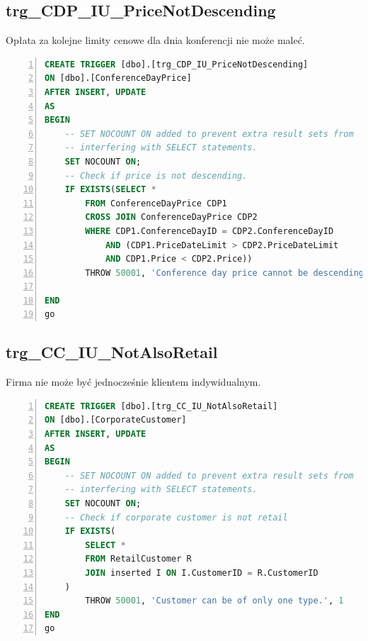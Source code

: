 \documentclass[]{article}
\begin{document}
	\subsection{trg\_CDP\_IU\_PriceNotDescending}
Opłata za kolejne limity cenowe dla dnia konferencji nie może maleć.
\begin{lstlisting}[language=SQL,
showspaces=false,
basicstyle=\ttfamily,
numbers=left,
numberstyle=\tiny,
tabsize=2,
backgroundcolor=\color{lightg},
keywordstyle=\color{lightblue},
commentstyle=\color{gray}]
CREATE TRIGGER [dbo].[trg_CDP_IU_PriceNotDescending]
ON [dbo].[ConferenceDayPrice]
AFTER INSERT, UPDATE
AS
BEGIN
	-- SET NOCOUNT ON added to prevent extra result sets from
	-- interfering with SELECT statements.
	SET NOCOUNT ON;
	-- Check if price is not descending.
	IF EXISTS(SELECT *
		FROM ConferenceDayPrice CDP1
		CROSS JOIN ConferenceDayPrice CDP2
		WHERE CDP1.ConferenceDayID = CDP2.ConferenceDayID
			AND (CDP1.PriceDateLimit > CDP2.PriceDateLimit
			AND CDP1.Price < CDP2.Price))
		THROW 50001, 'Conference day price cannot be descending.', 1

END
go

\end{lstlisting}

	\subsection{trg\_CC\_IU\_NotAlsoRetail}
Firma nie może być jednocześnie klientem indywidualnym. 
\begin{lstlisting}[language=SQL,
showspaces=false,
basicstyle=\ttfamily,
numbers=left,
numberstyle=\tiny,
tabsize=2,
backgroundcolor=\color{lightg},
keywordstyle=\color{lightblue},
commentstyle=\color{gray}]
CREATE TRIGGER [dbo].[trg_CC_IU_NotAlsoRetail]
ON [dbo].[CorporateCustomer]
AFTER INSERT, UPDATE
AS
BEGIN
	-- SET NOCOUNT ON added to prevent extra result sets from
	-- interfering with SELECT statements.
	SET NOCOUNT ON;
	-- Check if corporate customer is not retail
	IF EXISTS(
		SELECT *
		FROM RetailCustomer R
		JOIN inserted I ON I.CustomerID = R.CustomerID
	)
		THROW 50001, 'Customer can be of only one type.', 1
END
go

\end{lstlisting}
\end{document}
